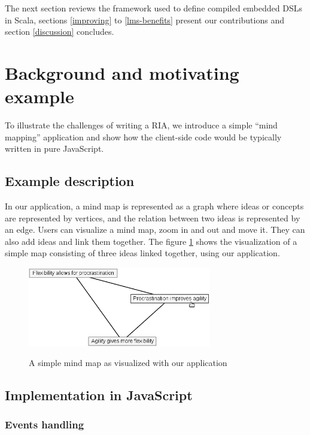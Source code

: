 \documentclass[american,english,runningheads]{llncs}
\begin{document}
The next section reviews the framework used to define compiled embedded DSLs in Scala, sections \ref{improving} to \ref{lms-benefits} present our contributions and section \ref{discussion} concludes.


\section{Background and motivating example}

To illustrate the challenges of writing a RIA, we introduce a simple “mind mapping” application and show how the client-side code would be typically written in pure JavaScript.

\subsection{Example description}

In our application, a mind map is represented as a graph where ideas or concepts are represented by vertices, and the relation between two ideas is represented by an edge. Users can visualize a mind map, zoom in and out and move it. They can also add ideas and link them together. The figure \ref{mindmap} shows the visualization of a simple map consisting of three ideas linked together, using our application.

\begin{figure}
 \caption{A simple mind map as visualized with our application}
 \centering
 \includegraphics[width=8cm]{mindmap.png}
 \label{mindmap}
\end{figure}

\subsection{Implementation in JavaScript}

\subsubsection{Events handling}
\end{document}
